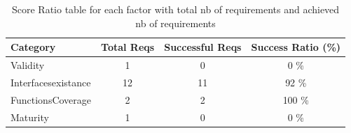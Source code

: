 \documentclass{article}
\begin{document}
						\begin{table}
						\centering
						\caption{Score Ratio table for each factor with total nb of requirements and achieved nb of requirements}
						\begin{tabular}{|l|c|c|c|}
						\hline
						Category & Total Reqs & Successful Reqs & Success Ratio (\%) \\
						\hline

							    Validity & 1 & 0 & 0 \% \\
							 

							    Interfacesexistance & 12 & 11 & 92 \% \\
							 

							    FunctionsCoverage & 2 & 2 & 100 \% \\
							 

							    Maturity & 1 & 0 & 0 \% \\
							 
					
						
						\hline
						\end{tabular}
						\end{table}




										
								

			
\end{document}
